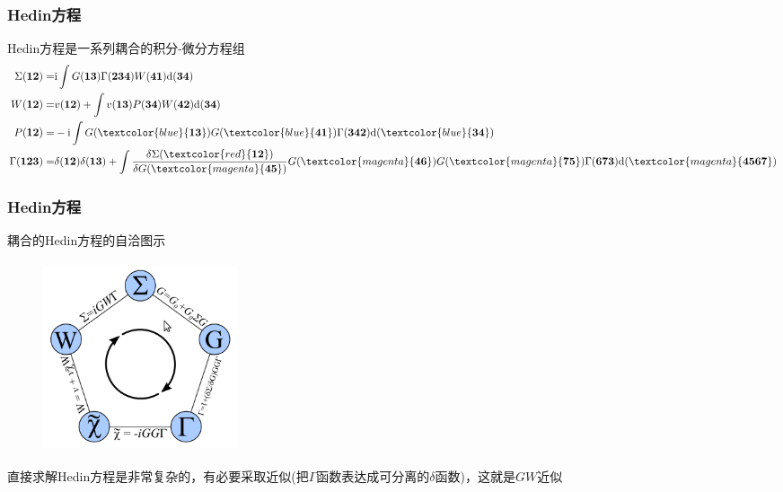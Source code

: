\frame
{
	\frametitle{\textrm{Hedin}方程} 
	\textrm{Hedin}方程是一系列耦合的积分-微分方程组%
	\begin{displaymath}
		\begin{aligned}
			\Sigma(\mathbf{12})=&\mathrm{i}\int G(\mathbf{13})\Gamma(\mathbf{234})W(\mathbf{41})\mathrm{d}(\mathbf{34})\\
			W(\mathbf{12})=&v(\mathbf{12})+\int v(\mathbf{13})P(\mathbf{34})W(\mathbf{42})\mathrm{d}(\mathbf{34})\\
			P(\mathbf{12})=&-\mathrm{i}\int G(\textcolor{blue}{\mathbf{13}})G(\textcolor{blue}{\mathbf{41}})\Gamma(\mathbf{342})\mathrm{d}(\textcolor{blue}{\mathbf{34}})\\
			\Gamma(\mathbf{123})=&\delta(\mathbf{12})\delta(\mathbf{13})+\int \frac{\delta\Sigma(\textcolor{red}{\mathbf{12}})}{\delta G(\textcolor{magenta}{\mathbf{45}})}G(\textcolor{magenta}{\mathbf{46}})G(\textcolor{magenta}{\mathbf{75}})\Gamma(\mathbf{673})\mathrm{d}(\textcolor{magenta}{\mathbf{4567}})
		\end{aligned}
	\end{displaymath}
	{\fontsize{7.2pt}{6.2pt}}
{\fontsize{9.0pt}{6.2pt}}
}

\frame
{
	\frametitle{\textrm{Hedin}方程} 
	耦合的\textrm{Hedin}方程的自洽图示
\begin{figure}[h!]
\centering
\vspace{-10pt}
\includegraphics[height=2.2in,width=2.25in,viewport=5 5 330 335,clip]{Figures/GW-1.png}
\label{GW-1}
\end{figure}
	直接求解\textrm{Hedin}方程是非常复杂的，有必要采取近似(把$\Gamma$函数表达成可分离的$\delta$函数)，这就是$GW$近似
}

